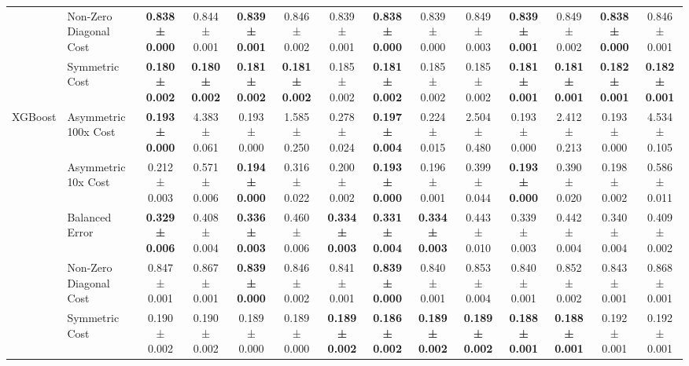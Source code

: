 \begin{table}[H]
{\begin{tabular}{llcccccccccccc}
 & Non-Zero Diagonal Cost & \textbf{0.838 ± 0.000} & 0.844 ± 0.001 & \textbf{0.839 ± 0.001} & 0.846 ± 0.002 & 0.839 ± 0.001 & \textbf{0.838 ± 0.000} & 0.839 ± 0.000 & 0.849 ± 0.003 & \textbf{0.839 ± 0.001} & 0.849 ± 0.002 & \textbf{0.838 ± 0.000} & 0.846 ± 0.001 \\
 & Symmetric Cost & \textbf{0.180 ± 0.002} & \textbf{0.180 ± 0.002} & \textbf{0.181 ± 0.002} & \textbf{0.181 ± 0.002} & 0.185 ± 0.002 & \textbf{0.181 ± 0.002} & 0.185 ± 0.002 & 0.185 ± 0.002 & \textbf{0.181 ± 0.001} & \textbf{0.181 ± 0.001} & \textbf{0.182 ± 0.001} & \textbf{0.182 ± 0.001} \\
\cline{1-14}
\multirow[t]{5}{*}{XGBoost} & Asymmetric 100x Cost & \textbf{0.193 ± 0.000} & 4.383 ± 0.061 & 0.193 ± 0.000 & 1.585 ± 0.250 & 0.278 ± 0.024 & \textbf{0.197 ± 0.004} & 0.224 ± 0.015 & 2.504 ± 0.480 & 0.193 ± 0.000 & 2.412 ± 0.213 & 0.193 ± 0.000 & 4.534 ± 0.105 \\
 & Asymmetric 10x Cost & 0.212 ± 0.003 & 0.571 ± 0.006 & \textbf{0.194 ± 0.000} & 0.316 ± 0.022 & 0.200 ± 0.002 & \textbf{0.193 ± 0.000} & 0.196 ± 0.001 & 0.399 ± 0.044 & \textbf{0.193 ± 0.000} & 0.390 ± 0.020 & 0.198 ± 0.002 & 0.586 ± 0.011 \\
 & Balanced Error & \textbf{0.329 ± 0.006} & 0.408 ± 0.004 & \textbf{0.336 ± 0.003} & 0.460 ± 0.006 & \textbf{0.334 ± 0.003} & \textbf{0.331 ± 0.004} & \textbf{0.334 ± 0.003} & 0.443 ± 0.010 & 0.339 ± 0.003 & 0.442 ± 0.004 & 0.340 ± 0.004 & 0.409 ± 0.002 \\
 & Non-Zero Diagonal Cost & 0.847 ± 0.001 & 0.867 ± 0.001 & \textbf{0.839 ± 0.000} & 0.846 ± 0.002 & 0.841 ± 0.001 & \textbf{0.839 ± 0.000} & 0.840 ± 0.001 & 0.853 ± 0.004 & 0.840 ± 0.001 & 0.852 ± 0.002 & 0.843 ± 0.001 & 0.868 ± 0.001 \\
 & Symmetric Cost & 0.190 ± 0.002 & 0.190 ± 0.002 & 0.189 ± 0.000 & 0.189 ± 0.000 & \textbf{0.189 ± 0.002} & \textbf{0.186 ± 0.002} & \textbf{0.189 ± 0.002} & \textbf{0.189 ± 0.002} & \textbf{0.188 ± 0.001} & \textbf{0.188 ± 0.001} & 0.192 ± 0.001 & 0.192 ± 0.001 \\
\cline{1-14}
\bottomrule
\end{tabular}
    }
\end{table}
